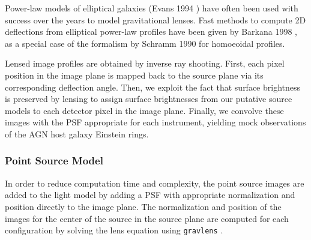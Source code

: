 \documentclass[a4paper,11pt]{article}
\begin{document}
 Power-law models of elliptical galaxies (Evans 1994 \cite{1994MNRAS.267..333E}) have often been used with
success over the years to model gravitational lenses.
 Fast methods to compute 2D deflections from elliptical power-law profiles have been given by Barkana 1998
\cite{1998ApJ...502..531B}, as a special case of the formalism by Schramm 1990 \cite{1990A&A...231...19S} for homoeoidal profiles.
%
%

Lensed image profiles are obtained by inverse ray shooting. First,
each pixel position in the image plane is mapped back to the source
plane via its corresponding deflection angle. Then, we exploit
the fact that surface brightness is preserved by lensing to assign
surface brightnesses from our putative source models to each detector pixel in the image plane.
Finally, we convolve these images with the PSF appropriate for each instrument, yielding
mock observations of the AGN host galaxy Einstein rings.


\subsubsection{Point Source Model}

In order to reduce computation time and complexity, the point source
images are added to the light model by adding a PSF with appropriate
normalization and position directly to the image plane. The
normalization and position of the images for the center of the source
in the source plane are computed for each configuration by solving the
lens equation using \texttt{gravlens} \cite{2011ascl.soft02003K}.
\end{document}
